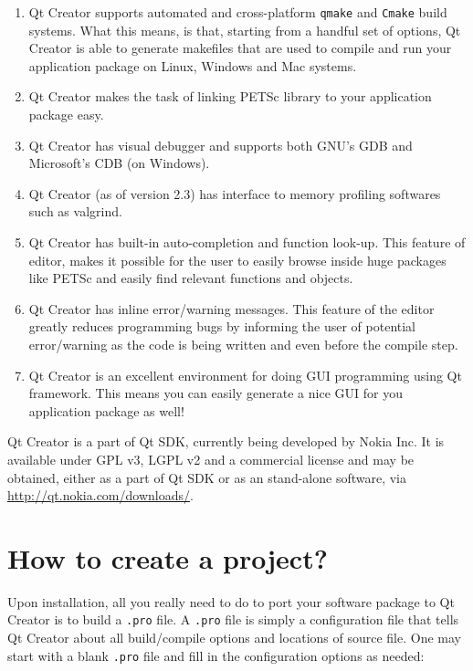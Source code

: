 {{{\begin{enumerate}
\item Qt Creator supports automated and cross-platform \texttt{qmake} and \texttt{Cmake} build systems. What this means, is that, starting from a handful set of options, Qt Creator is able to generate makefiles that are used to compile and run your application package on Linux, Windows and Mac systems.
\item Qt Creator makes the task of linking PETSc library to your application package easy.
\item Qt Creator has visual debugger and supports both GNU's GDB and Microsoft's CDB (on Windows).
\item Qt Creator (as of version 2.3) has interface to memory profiling softwares such as valgrind.
\item Qt Creator has built-in auto-completion and function look-up. This feature of editor, makes it possible for the user to easily browse inside huge packages like PETSc and easily find relevant functions and objects.
\item Qt Creator has inline error/warning messages. This feature of the editor greatly reduces programming bugs by informing the user of potential error/warning as the code is being written and even before the compile step.
\item Qt Creator is an excellent environment for doing GUI programming using Qt framework. This means you can easily generate a nice GUI for you application package as well!
\end{enumerate}

Qt Creator is a part of Qt SDK, currently being developed by Nokia Inc. It is available under GPL v3, LGPL v2 and a commercial license and may be obtained, either as a part of Qt SDK or as an stand-alone software, via \url{http://qt.nokia.com/downloads/}.

\section*{How to create a project?}
Upon installation, all you really need to do to port your software package to Qt Creator is to build a \texttt{.pro} file. A \texttt{.pro} file is simply a configuration file that tells Qt Creator about all build/compile options and locations of source file. One may start with a blank \texttt{.pro} file and fill in the configuration options as needed:

\begin{lstlisting}


\end{lstlisting}}}}

